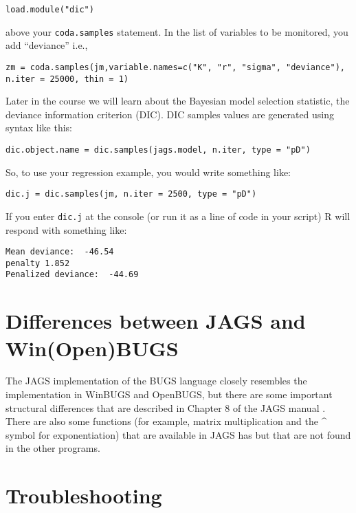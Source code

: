 \documentclass[12pt,english]{article}
\begin{document}
\begin{Verbatim}
load.module("dic")
\end{Verbatim}

\noindent above your \texttt{coda.samples} statement. In the list of variables to be monitored, you add \enquote{deviance} i.e.,

\begin{Verbatim}
zm = coda.samples(jm,variable.names=c("K", "r", "sigma", "deviance"), 
n.iter = 25000, thin = 1)
\end{Verbatim}

\noindent Later in the course we will learn about the Bayesian model selection statistic, the deviance information criterion (DIC). DIC samples values are generated using syntax like this:

\begin{Verbatim}
dic.object.name = dic.samples(jags.model, n.iter, type = "pD")
\end{Verbatim}

\noindent So, to use your regression example, you would write something like:

\begin{Verbatim}
dic.j = dic.samples(jm, n.iter = 2500, type = "pD")
\end{Verbatim}

\noindent If you enter \texttt{dic.j} at the console (or run it as a line of code in your script) R will respond with something like:

\begin{Verbatim}
Mean deviance:  -46.54
penalty 1.852
Penalized deviance:  -44.69
\end{Verbatim}

\section{Differences between JAGS and Win(Open)BUGS}

The JAGS implementation of the BUGS language closely resembles the implementation in WinBUGS and OpenBUGS, but there are some important structural differences that are described in Chapter 8 of the JAGS manual \citep{Plummer_mannual}. There are also some functions (for example, matrix multiplication and the \textasciicircum{} symbol for exponentiation) that are available in JAGS has but that are not found in the other programs.

\section{Troubleshooting}
\end{document}

